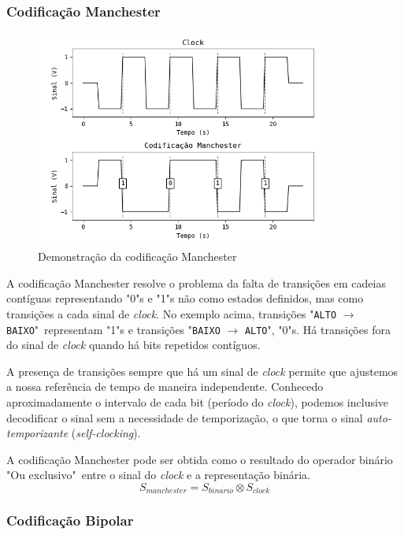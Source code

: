 \documentclass[titlepage,twocolumn]{article}
\begin{document}
\subsubsection{Codificação Manchester}
\label{sec:manchester}
\begin{figure}[H]
    \begin{center}
        \includegraphics[width=9.5cm]{imgs/codificacao_manchester.png}
        \caption{Demonstração da codificação Manchester}
        \label{fig:manchester}
    \end{center}
\end{figure}

A codificação Manchester resolve o problema da falta de transições em cadeias contíguas representando "0"s e "1"s não como estados definidos, mas como transições a cada sinal de \textit{clock}. No exemplo acima, tran\-sições "\texttt{ALTO} $\rightarrow$ \texttt{BAIXO}"\   representam "1"s e transições "\texttt{BAIXO} $\rightarrow$ \texttt{ALTO}", "0"s. Há transições fora do sinal de \textit{clock} quando há bits repetidos contíguos.

A presença de transições sempre que há um sinal de \textit{clock} permite que ajustemos a nossa referência de tempo de maneira independente. Conhecedo aproximadamente o intervalo de cada bit (período do \textit{clock}), podemos inclusive decodificar o sinal sem a necessidade de temporização, o que torna o sinal \textit{auto-temporizante} (\textit{self-clocking}).

A codificação Manchester pode ser obtida como o resultado do operador binário "Ou exclusivo"\ entre o sinal do \textit{clock} e a representação binária.
\[
    S_{manchester} = S_{binario} \otimes S_{clock}
\]

\subsubsection{Codificação Bipolar}
\label{sub:bipolar}
\end{document}
